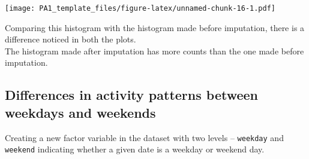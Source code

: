\documentclass[
]{article}
\newenvironment{Shaded}{\begin{snugshade}}{\end{snugshade}}
\newcommand{\AttributeTok}[1]{\textcolor[rgb]{0.77,0.63,0.00}{#1}}
\newcommand{\CommentTok}[1]{\textcolor[rgb]{0.56,0.35,0.01}{\textit{#1}}}
\newcommand{\ConstantTok}[1]{\textcolor[rgb]{0.00,0.00,0.00}{#1}}
\newcommand{\FunctionTok}[1]{\textcolor[rgb]{0.00,0.00,0.00}{#1}}
\newcommand{\NormalTok}[1]{#1}
\newcommand{\OtherTok}[1]{\textcolor[rgb]{0.56,0.35,0.01}{#1}}
\newcommand{\SpecialCharTok}[1]{\textcolor[rgb]{0.00,0.00,0.00}{#1}}
\newcommand{\StringTok}[1]{\textcolor[rgb]{0.31,0.60,0.02}{#1}}
\begin{document}
\texttt{[image: PA1\_template\_files/figure-latex/unnamed-chunk-16-1.pdf]}

Comparing this histogram with the histogram made before imputation,
there is a difference noticed in both the plots.\\
The histogram made after imputation has more counts than the one made
before imputation.

\hypertarget{differences-in-activity-patterns-between-weekdays-and-weekends}{%
\subsection{Differences in activity patterns between weekdays and
weekends}\label{differences-in-activity-patterns-between-weekdays-and-weekends}}

Creating a new factor variable in the dataset with two levels --
\texttt{weekday} and \texttt{weekend} indicating whether a given date is
a weekday or weekend day.

\begin{Shaded}
\end{Shaded}
\end{document}
